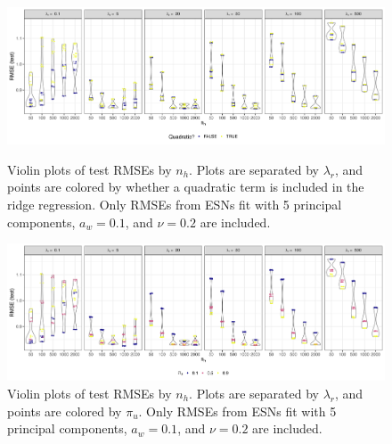 \documentclass[AMS,STIX2COL]{WileyNJD-v2}
\begin{document}
\begin{figure}[h]
    \centering
    \includegraphics[width=\textwidth]{figures/merra2_hyper_param_nh_quad.png}
    \caption{Violin plots of test RMSEs by $n_h$. Plots are separated by $\lambda_r$, and points are colored by whether a quadratic term is included in the ridge regression. Only RMSEs from ESNs fit with 5 principal components, $a_w=0.1$, and $\nu=0.2$ are included.}
    \label{fig:hp_nh_quad}
    \vspace{1cm}
    \includegraphics[width=\textwidth]{figures/merra2_hyper_param_nh_upi.png}
    \caption{Violin plots of test RMSEs by $n_h$. Plots are separated by $\lambda_r$, and points are colored by $\pi_u$. Only RMSEs from ESNs fit with 5 principal components, $a_w=0.1$, and $\nu=0.2$ are included.}
    \label{fig:hp_nh_upi}
\end{figure}
\end{document}
